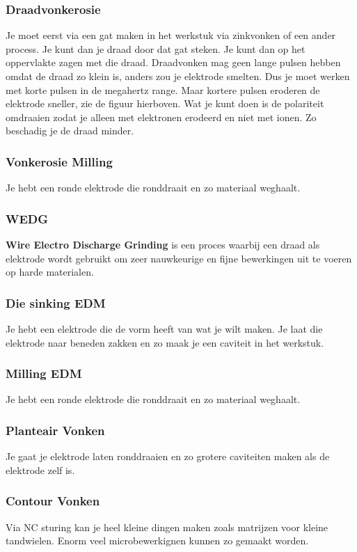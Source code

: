 \documentclass[a4paper,12pt,twoside]{report}
\begin{document}
\subsubsection{Draadvonkerosie}
Je moet eerst via een gat maken in het werkstuk via zinkvonken of een ander process. Je kunt dan je draad door dat gat steken.
Je kunt dan op het oppervlakte zagen met die draad.
\newline
Draadvonken mag geen lange pulsen hebben omdat de draad zo klein is, anders zou je elektrode smelten. Dus je moet werken met korte pulsen in de megahertz range.
Maar kortere pulsen eroderen de elektrode sneller, zie de figuur hierboven.
Wat je kunt doen is de polariteit omdraaien
zodat je alleen met elektronen erodeerd en niet met ionen.
Zo beschadig je de draad minder.
\newline
\subsubsection{Vonkerosie Milling}
Je hebt een ronde elektrode die ronddraait en zo materiaal weghaalt.
\newline

\subsubsection{WEDG}
\textbf{Wire Electro Discharge Grinding} is een proces waarbij een draad als elektrode wordt gebruikt om zeer nauwkeurige en fijne bewerkingen uit te voeren op harde materialen.

\subsubsection{Die sinking EDM}
Je hebt een elektrode die de vorm heeft van wat je wilt maken.
\newline
Je laat die elektrode naar beneden zakken en zo maak je een caviteit in het werkstuk.
\subsubsection{Milling EDM}
Je hebt een ronde elektrode die ronddraait en zo materiaal weghaalt.
\subsubsection{Planteair Vonken}
Je gaat je elektrode laten ronddraaien en zo grotere caviteiten maken als de elektrode zelf is.
\subsubsection{Contour Vonken}
Via NC sturing kan je heel kleine dingen maken zoals matrijzen voor kleine tandwielen.
Enorm veel microbewerkignen kunnen zo gemaakt worden.
\end{document}
